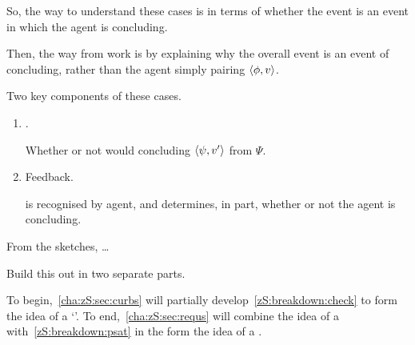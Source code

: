 \begin{note}
  So, the way to understand these cases is in terms of whether the event is an event in which the agent is concluding.

  Then, the way  from  work is by explaining why the overall event is an event of concluding, rather than the agent simply pairing \(\langle \phi, v \rangle\).
\end{note}

\begin{note}
  Two key components of these cases.
  \begin{enumerate}[label=\Roman*., ref=(\Roman*)]
  \item
    \label{zS:breakdown:check}
    .

    Whether or not would concluding \(\langle \psi, v' \rangle\) from \(\Psi\).
  \item
    \label{zS:breakdown:psat}
    Feedback.

    \check{} is recognised by agent, and determines, in part, whether or not the agent is concluding.
  \end{enumerate}

  From the sketches, {\color{red} \dots}
\end{note}

\begin{note}
  Build this out in two separate parts.

  To begin,~\autoref{cha:zS:sec:curbs} will partially develop~\ref{zS:breakdown:check} to form the idea of a `\curb{}'.
  To end,~\ref{cha:zS:sec:requs} will combine the idea of a \curb{} with~\ref{zS:breakdown:psat} in the form the idea of a \requ{}.
\end{note}

\section{}
\label{cha:zS:sec:curbs}

